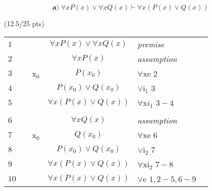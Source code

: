 \documentclass[a4paper,12pt]{article}
\begin{document}
	
	\begin{equation*}
	\textbf{a)} \; \forall x P(x) \vee \forall x Q(x) \vdash \forall x (P(x) \vee Q(x)) 
	\end{equation*}
	
	\hfill \small{(12.5/25 pts)}\\
	\begin{tcolorbox}
		
		
		
		\begin{table}[H]
			\centering
			\begin{tabular}{lllcll}
				\hline 
				\hline
				
				$1$ & & & $\forall x P(x)\lor \forall x Q(x)$ & \textit{premise} & \\ \cline{2-6}
				
				$2$ & \multicolumn{1}{|l}{} & & $\forall x P(x)$ & \textit{assumption} &\multicolumn{1}{l|}{} \\ \cline{3-5}
				
				$3$ & \multicolumn{1}{|l}{} & \multicolumn{1}{|l}{x$_0$} & $P(x_0)$ &\multicolumn{1}{l|}{$\forall$xe $2$} &\multicolumn{1}{l|}{} \\
				
				$4$ & \multicolumn{1}{|l}{} & \multicolumn{1}{|l}{} & $P(x_0)\lor Q(x_0)$ &\multicolumn{1}{l|}{$\lor$i$_1$ $3$} &\multicolumn{1}{l|}{} \\ \cline{3-5}
				
				$5$ & \multicolumn{1}{|l}{} & & $\forall x (P(x)\lor Q(x))$ & $\forall$x$i_1$ $3-4$ &\multicolumn{1}{l|}{} \\ \cline{2-6}
				
				& & & & & \\ \cline{2-6}
				
				$6$ & \multicolumn{1}{|l}{} & & $\forall x Q(x)$ & \textit{assumption} &\multicolumn{1}{l|}{} \\ \cline{3-5}
				
				$7$ & \multicolumn{1}{|l}{} & \multicolumn{1}{|l}{x$_0$} & $Q(x_0)$ &\multicolumn{1}{l|}{$\forall$xe $6$} &\multicolumn{1}{l|}{} \\
				
				$8$ & \multicolumn{1}{|l}{} & \multicolumn{1}{|l}{} & $P(x_0)\lor Q(x_0)$ &\multicolumn{1}{l|}{$\lor$i$_2$ $7$} &\multicolumn{1}{l|}{} \\ \cline{3-5}
				
				$9$ & \multicolumn{1}{|l}{} & & $\forall x (P(x)\lor Q(x))$ & $\forall$xi$_2$ $7-8$ &\multicolumn{1}{l|}{} \\ \cline{2-6}
				
				$10$ & & & $\forall x (P(x)\lor Q(x))$ & $\lor$e $1,2-5,6-9$ & \\	
				
			\end{tabular}
		\end{table}
	\end{tcolorbox}
	
\end{document}
